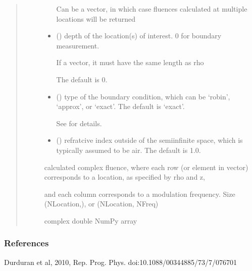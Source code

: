 \documentclass[letterpaper,10pt,english]{sphinxmanual}
\begin{document}
\begin{fulllineitems}
\begin{quote}
\begin{description}
\begin{itemize}
\sphinxAtStartPar
Can be a vector, in which case fluences calculated at multiple locations will be returned


\item {} 
\sphinxAtStartPar
{} (\sphinxstyleliteralemphasis{\sphinxupquote{, }}) \textendash{} 
\sphinxAtStartPar
depth of the location(s) of interest. 0 for boundary measurement.

\sphinxAtStartPar
If a vector, it must have the same length as rho

\sphinxAtStartPar
The default is 0.


\item {} 
\sphinxAtStartPar
{} (\sphinxstyleliteralemphasis{\sphinxupquote{, }}) \textendash{} 
\sphinxAtStartPar
type of the boundary condition, which can be ‘robin’, ‘approx’, or ‘exact’. The default is ‘exact’.

\sphinxAtStartPar
See {\hyperref[\detokenize{_autosummary/nirfasterff.utils.boundary_attenuation:nirfasterff.utils.boundary_attenuation}]{}} for details.


\item {} 
\sphinxAtStartPar
{} (\sphinxstyleliteralemphasis{\sphinxupquote{, }}) \textendash{} refratcive index outside of the semi\sphinxhyphen{}infinite space, which is typically assumed to be air. The default is 1.0.

\end{itemize}

\sphinxAtStartPar

\sphinxAtStartPar
calculated complex fluence, where each row (or element in vector) corresponds to a location, as specified by rho and z,

\sphinxAtStartPar
and each column corresponds to a modulation frequency. Size (NLocation,), or (NLocation, NFreq)


\sphinxAtStartPar
complex double NumPy array

\end{description}\end{quote}
\subsubsection*{References}

\sphinxAtStartPar
Durduran et al, 2010, Rep. Prog. Phys. doi:10.1088/0034\sphinxhyphen{}4885/73/7/076701

\end{fulllineitems}
\end{document}
